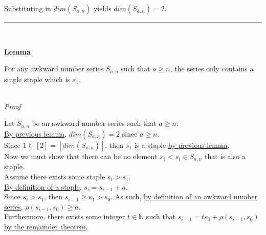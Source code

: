 \documentclass[a4paper,12pt]{article}
\begin{document}
\noindent Substituting in $dim(S_{a, n})$ yields $dim(S_{a,n}) = 2$.\\

\begin{center}
\noindent\rule{8cm}{0.4pt}
\end{center}
\noindent \\









\label{lemma:only_staple}
\hypertarget{lemma:only_staple}{}
\begin{tcolorbox}
\textbf{Lemma}

\noindent For any awkward number series $S_{a,n}$ such that $a \geq n$, the series only contains a single staple which is $s_1$.

\end{tcolorbox}

\noindent \\
\textit{Proof}

\noindent Let $S_{a, n}$ be an awkward number series such that $a \geq n$.\\

\noindent \hyperlink{lemma:dimension_a_greater_equal_n}{By previous lemma}, $dim(S_{a, n}) = 2$ since $a \geq n$.\\

\noindent Since $1 \in [2] = [dim(S_{a, n})]$, then $s_1$ is a staple \hyperlink{lemma:initial_staples}{by previous lemma}.\\

\noindent Now we must show that there can be no element $s_1 < s_i \in S_{a, n}$ that is also a staple.\\

\noindent Assume there exists some staple $s_i > s_1$.\\

\noindent \hyperlink{definition:staple}{By definition of a staple}, $s_i = s_{i - 1} + a$.\\

\noindent Since $s_i > s_1$, then $s_{i - 1} \geq s_1 > s_0$. As such, \hyperlink{definition:awkward_number_series}{by definition of an awkward number series}, $\rho(s_{i - 1}, s_0) \geq a$.\\

\noindent Furthermore, there exists some integer $t \in \mathbb{N}$ such that $s_{i - 1} = ts_0 + \rho(s_{i - 1}, s_0)$ \hyperlink{theorem:remainder_theorem}{by the remainder theorem}.\\
\end{document}
